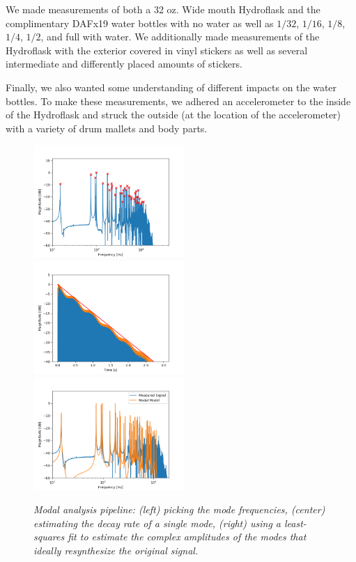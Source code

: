 \documentclass[twoside,a4paper]{article}
\begin{document}
We made measurements of both a 32 oz. Wide mouth Hydroflask and the complimentary DAFx19 water bottles with no water as well as $1/32$, $1/16$, $1/8$, $1/4$, $1/2$, and full with water. We additionally made measurements of the Hydroflask with the exterior covered in vinyl stickers as well as several intermediate and differently placed amounts of stickers. 

Finally, we also wanted some understanding of different impacts on the water bottles. To make these measurements, we adhered an accelerometer to the inside of the Hydroflask and struck the outside (at the location of the accelerometer) with a variety of drum mallets and body parts.  



%
%


\begin{figure}
    \centering
    \includegraphics[width=2.25in,trim={0 0 1cm 1cm},clip]{../Figures/ModePick_ex}
    \includegraphics[width=2.25in,trim={0 0 1cm 1cm},clip]{../Figures/DecayFit_ex}
    \includegraphics[width=2.25in,trim={0 0 1cm 1cm},clip]{../Figures/Model_ex}
    \caption{\it{Modal analysis pipeline: (left) picking the mode frequencies,
    (center) estimating the decay rate of a single mode,
    (right) using a least-squares fit to estimate the complex
    amplitudes of the modes that ideally resynthesize the
    original signal.}}
    \label{fig:modal_analysis}
\end{figure}
\end{document}

